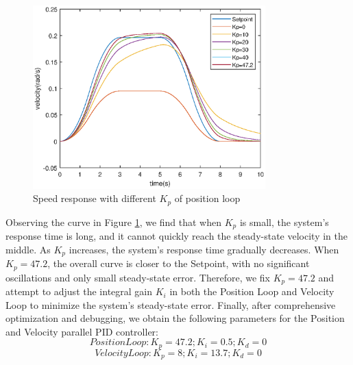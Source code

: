 \documentclass[11pt,a4paper]{article}%
\begin{document}
\begin{figure}[H]
    \centering
    \includegraphics[width=0.8\textwidth]{2pkp}
    \caption{Speed response with different $K_p$ of position loop}
    \label{2pkp}
\end{figure}
Observing the curve in Figure \ref{2pkp}, we find that when $K_p$ is small, the system's response time is long, and it cannot quickly reach the steady-state velocity in the middle. As 
$K_p$ increases, the system's response time gradually decreases. When 
$K_p=47.2$, the overall curve is closer to the Setpoint, with no significant oscillations and only small steady-state error. Therefore, we fix $K_p=47.2$ and attempt to adjust the integral gain $K_i$ in both the Position Loop and Velocity Loop to minimize the system's steady-state error. Finally, after comprehensive optimization and debugging, we obtain the following parameters for the Position and Velocity parallel PID controller:
$$Position Loop:K_p=47.2; K_i=0.5; K_d=0$$
$$Velocity Loop:K_p=8;K_i=13.7;K_d=0$$
\end{document}
